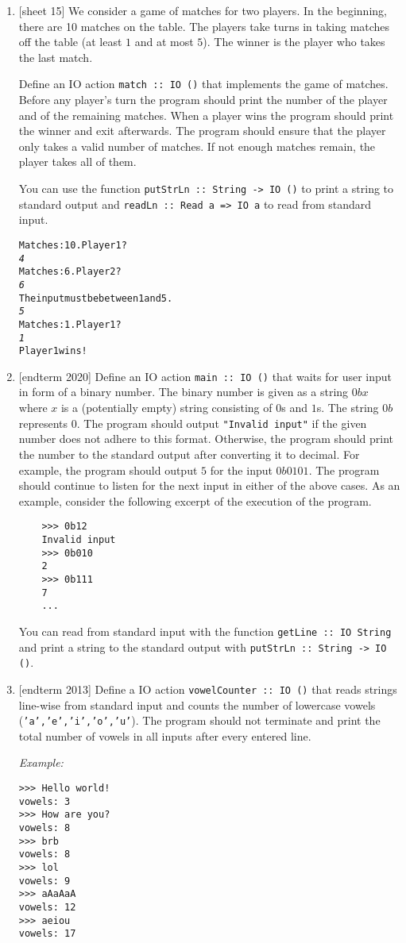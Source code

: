 \documentclass{article}
\def\code#1{\texttt{#1}}
\begin{document}
\begin{enumerate}
    \item {[sheet 15]} We consider a game of matches for two players. In the beginning, there are 10 matches on the table. The players take turns in taking matches off the table (at least $1$ and at most $5$). The winner is the player who takes the last match. \par
        Define an IO action \code{match :: IO ()} that implements the game of matches. Before any player's turn the program should print the number of the player and of the remaining matches. When a player wins the program should print the winner and exit afterwards. The program should ensure that the player only takes a valid number of matches. If not enough matches remain, the player takes all of them. \par
        You can use the function \code{putStrLn :: String -> IO ()} to print a string to standard output and \code{readLn :: Read a => IO a} to read from standard input.
        \begin{alltt}
    Matches: 10. Player 1?
    \textit{4}
    Matches: 6. Player 2?
    \textit{6}
    The input must be between 1 and 5.
    \textit{5}
    Matches: 1. Player 1?
    \textit{1}
    Player 1 wins!
        \end{alltt}

    \item {[endterm 2020]} Define an IO action \code{main :: IO ()} that waits for user input in form of a binary number. The binary number is given as a string $0bx$ where $x$ is a (potentially empty) string consisting of $0$s and $1$s. The string $0b$ represents $0$. The program should output \code{"Invalid input"} if the given number does not adhere to this format. Otherwise, the program should print the number to the standard output after converting it to decimal. For example, the program should output $5$ for the input $0b0101$. The program should continue to listen for the next input in either of the above cases. As an example, consider the following excerpt of the execution of the program.
        \begin{verbatim}
    >>> 0b12
    Invalid input
    >>> 0b010
    2
    >>> 0b111
    7
    ...
        \end{verbatim}
        You can read from standard input with the function \code{getLine :: IO String} and print a string to the standard output with \code{putStrLn :: String -> IO ()}.

    \item {[endterm 2013]} Define a IO action \code{vowelCounter :: IO ()} that reads strings line-wise from standard input and counts the number of lowercase vowels (\code{'a','e','i','o','u'}). The program should not terminate and print the total number of vowels in all inputs after every entered line. \par
        \textit{Example:}
        \begin{verbatim}
>>> Hello world!
vowels: 3
>>> How are you?
vowels: 8
>>> brb
vowels: 8
>>> lol
vowels: 9
>>> aAaAaA
vowels: 12
>>> aeiou
vowels: 17
        \end{verbatim}
\end{enumerate}
\end{document}
